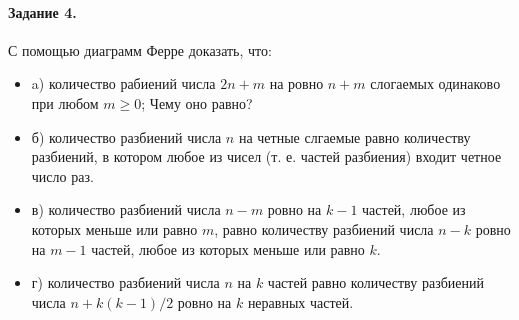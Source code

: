 \documentclass[a4paper,12pt]{article}
\begin{document}
\paragraph{Задание 4.} С помощью диаграмм Ферре доказать, что:
\begin{itemize}
\item a) количество рабиений числа $2n + m$ на ровно $n+m$ слогаемых одинаково при любом $m \ge 0$; Чему оно равно?

\item б) количество разбиений числа $n$ на четные слгаемые равно количеству разбиений, в котором любое из чисел (т. е. частей разбиения) входит четное число раз.

\item в) количество разбиений числа $n-m$ ровно на $k-1$ частей, любое из которых меньше или равно $m$, равно количеству разбиений числа $n-k$ ровно на $m-1$ частей, любое из которых меньше или равно $k$.

\item г) количество разбиений числа $n$ на $k$ частей равно количеству разбиений числа $n + {k\left(k-1\right)}/2$ ровно на $k$ неравных частей.
\end{itemize}
\end{document}
